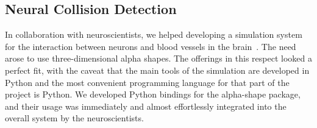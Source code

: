 \subsection{Neural Collision Detection}
\label{ssec:neural}
In collaboration with neuroscientists, we helped developing a simulation system for the interaction between neurons and blood vessels in the brain~\cite{Har-Gil2021.07.20.452894}. The need arose to use three-dimensional alpha shapes. The \cgal{} offerings in this respect looked a perfect fit, with the caveat that the main tools of the simulation are developed in Python and the most convenient programming language for that part of the project is Python. We developed Python bindings for the \cgal{} alpha-shape package, and their usage was immediately and almost effortlessly integrated into the overall system by the neuroscientists.
